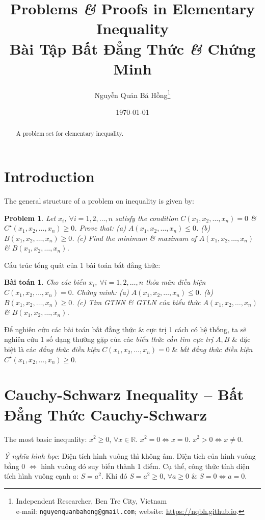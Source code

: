 \documentclass{article}
\title{Problems \textit{\&} Proofs in Elementary Inequality\\Bài Tập Bất Đẳng Thức \textit{\&} Chứng Minh}
\author{Nguyễn Quản Bá Hồng\footnote{Independent Researcher, Ben Tre City, Vietnam\\e-mail: \texttt{nguyenquanbahong@gmail.com}; website: \url{https://nqbh.github.io}.}}
\date{\today}
\newtheorem{baitoan}{Bài toán}
\newtheorem{problem}{Problem}
\begin{document}
\maketitle
\begin{abstract}
	A problem set for elementary inequality.
\end{abstract}
\tableofcontents


\section{Introduction}
The general structure of a problem on inequality is given by:

\begin{problem}
	Let $x_i$, $\forall i = 1,2,\ldots,n$ satisfy the condition $C(x_1,x_2,\ldots,x_n) = 0$ \& $C^\star(x_1,x_2,\ldots,x_n)\ge0$. Prove that: (a) $A(x_1,x_2,\ldots,x_n)\le0$. (b) $B(x_1,x_2,\ldots,x_n)\ge0$. (c) Find the minimum \& maximum of $A(x_1,x_2,\ldots,x_n)$ \& $B(x_1,x_2,\ldots,x_n)$.
\end{problem}
Cấu trúc tổng quát của 1 bài toán bất đẳng thức:

\begin{baitoan}
	Cho các biến $x_i$, $\forall i = 1,2,\ldots,n$ thỏa mãn điều kiện $C(x_1,x_2,\ldots,x_n) = 0$. Chứng minh: (a) $A(x_1,x_2,\ldots,x_n)\le0$. (b) $B(x_1,x_2,\ldots,x_n)\ge0$. (c) Tìm {\rm GTNN} \& {\rm GTLN} của biểu thức $A(x_1,x_2,\ldots,x_n)$ \& $B(x_1,x_2,\ldots,x_n)$.
\end{baitoan}
Để nghiên cứu các bài toán bất đẳng thức \& cực trị 1 cách có hệ thống, ta sẽ nghiên cứu 1 số dạng thường gặp của các \textit{biểu thức cần tìm cực trị} $A,B$ \& đặc biệt là các \textit{đẳng thức điều kiện} $C(x_1,x_2,\ldots,x_n) = 0$ \& \textit{bất đẳng thức điều kiện} $C^\star(x_1,x_2,\ldots,x_n)\ge0$.


\section{Cauchy-Schwarz Inequality -- Bất Đẳng Thức Cauchy-Schwarz}
The most basic inequality: $x^2\ge0$, $\forall x\in\mathbb{R}$. $x^2 = 0\Leftrightarrow x = 0$. $x^2 > 0\Leftrightarrow x\ne0$.

\textit{Ý nghĩa hình học}: Diện tích hình vuông thì không âm. Diện tích của hình vuông bằng 0 $\Leftrightarrow$ hình vuông đó suy biến thành 1 điểm. Cụ thể, công thức tính diện tích hình vuông cạnh $a$: $S = a^2$. Khi đó $S = a^2\ge0$, $\forall a\ge0$ \& $S = 0\Leftrightarrow a = 0$.
\end{document}
